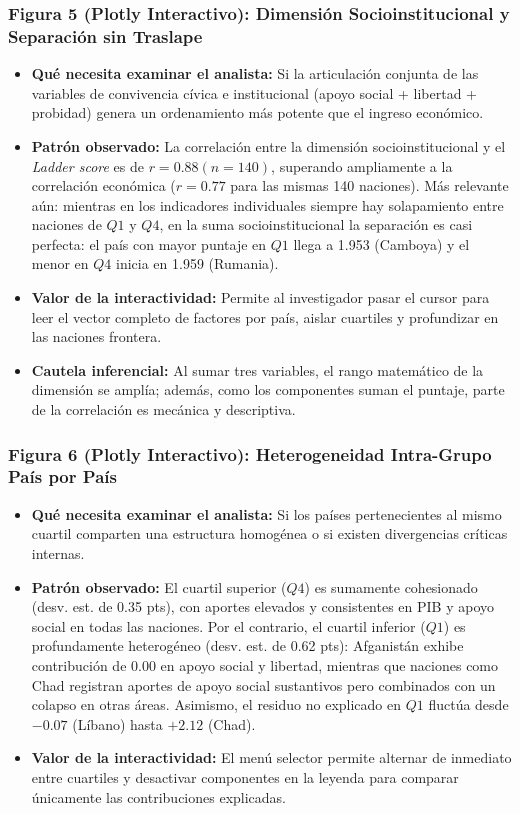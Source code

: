 \documentclass[11pt]{article}
\begin{document}
\subsubsection{Figura 5 (Plotly Interactivo): Dimensión Socioinstitucional y Separación sin Traslape}
\begin{itemize}
    \item \textbf{Qué necesita examinar el analista:} Si la articulación conjunta de las variables de convivencia cívica e institucional (apoyo social + libertad + probidad) genera un ordenamiento más potente que el ingreso económico.
    \item \textbf{Patrón observado:} La correlación entre la dimensión socioinstitucional y el \textit{Ladder score} es de $r = 0.88 (n = 140)$, superando ampliamente a la correlación económica ($r = 0.77$ para las mismas 140 naciones). Más relevante aún: mientras en los indicadores individuales siempre hay solapamiento entre naciones de $Q1$ y $Q4$, en la suma socioinstitucional la separación es casi perfecta: el país con mayor puntaje en $Q1$ llega a 1.953 (Camboya) y el menor en $Q4$ inicia en 1.959 (Rumania).
    \item \textbf{Valor de la interactividad:} Permite al investigador pasar el cursor para leer el vector completo de factores por país, aislar cuartiles y profundizar en las naciones frontera.
    \item \textbf{Cautela inferencial:} Al sumar tres variables, el rango matemático de la dimensión se amplía; además, como los componentes suman el puntaje, parte de la correlación es mecánica y descriptiva.
\end{itemize}

\subsubsection{Figura 6 (Plotly Interactivo): Heterogeneidad Intra-Grupo País por País}
\begin{itemize}
    \item \textbf{Qué necesita examinar el analista:} Si los países pertenecientes al mismo cuartil comparten una estructura homogénea o si existen divergencias críticas internas.
    \item \textbf{Patrón observado:} El cuartil superior ($Q4$) es sumamente cohesionado (desv. est. de 0.35 pts), con aportes elevados y consistentes en PIB y apoyo social en todas las naciones. Por el contrario, el cuartil inferior ($Q1$) es profundamente heterogéneo (desv. est. de 0.62 pts): Afganistán exhibe contribución de 0.00 en apoyo social y libertad, mientras que naciones como Chad registran aportes de apoyo social sustantivos pero combinados con un colapso en otras áreas. Asimismo, el residuo no explicado en $Q1$ fluctúa desde $-0.07$ (Líbano) hasta $+2.12$ (Chad).
    \item \textbf{Valor de la interactividad:} El menú selector permite alternar de inmediato entre cuartiles y desactivar componentes en la leyenda para comparar únicamente las contribuciones explicadas.
\end{itemize}
\end{document}
